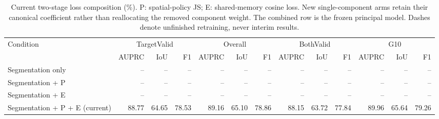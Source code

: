 \begin{table}[!t]
\caption{Current two-stage loss composition (\%). P: spatial-policy JS; E: shared-memory cosine loss. New single-component arms retain their canonical coefficient rather than reallocating the removed component weight. The combined row is the frozen principal model. Dashes denote unfinished retraining, never interim results.}
\label{tab:loss_parts}
\centering\scriptsize
\setlength{\tabcolsep}{3pt}
\begin{tabular}{lrrrrrrrrrrrr}
\toprule
Condition & \multicolumn{3}{c}{TargetValid} & \multicolumn{3}{c}{Overall} & \multicolumn{3}{c}{BothValid} & \multicolumn{3}{c}{G10}\\
 & AUPRC & IoU & F1 & AUPRC & IoU & F1 & AUPRC & IoU & F1 & AUPRC & IoU & F1\\
\midrule
Segmentation only & -- & -- & -- & -- & -- & -- & -- & -- & -- & -- & -- & --\\
Segmentation + P & -- & -- & -- & -- & -- & -- & -- & -- & -- & -- & -- & --\\
Segmentation + E & -- & -- & -- & -- & -- & -- & -- & -- & -- & -- & -- & --\\
Segmentation + P + E (current) & 88.77 & 64.65 & 78.53 & 89.16 & 65.10 & 78.86 & 88.15 & 63.72 & 77.84 & 89.96 & 65.64 & 79.26\\
\bottomrule
\end{tabular}
\end{table}
